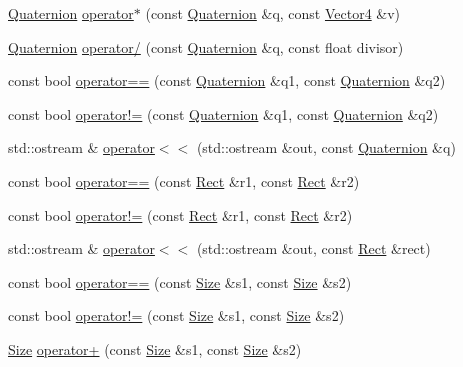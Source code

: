 \begin{DoxyCompactItemize}
\item 
\hyperlink{classprism_1_1_quaternion}{Quaternion} \hyperlink{namespaceprism_a2c4c5e120d8c4de9891f2261a50f100e}{operator$\ast$} (const \hyperlink{classprism_1_1_quaternion}{Quaternion} \&q, const \hyperlink{classprism_1_1_vector4}{Vector4} \&v)
\item 
\hyperlink{classprism_1_1_quaternion}{Quaternion} \hyperlink{namespaceprism_aec648937a53338bcd9879670877d0425}{operator/} (const \hyperlink{classprism_1_1_quaternion}{Quaternion} \&q, const float divisor)
\item 
const bool \hyperlink{namespaceprism_ac4ae112433b9ab32c801cccc9c3f74f0}{operator==} (const \hyperlink{classprism_1_1_quaternion}{Quaternion} \&q1, const \hyperlink{classprism_1_1_quaternion}{Quaternion} \&q2)
\item 
const bool \hyperlink{namespaceprism_a9e32551f997ae19dc52df146482405c1}{operator!=} (const \hyperlink{classprism_1_1_quaternion}{Quaternion} \&q1, const \hyperlink{classprism_1_1_quaternion}{Quaternion} \&q2)
\item 
std\+::ostream \& \hyperlink{namespaceprism_ad2beaed7a837821f0abc608cf6ac6c0f}{operator$<$$<$} (std\+::ostream \&out, const \hyperlink{classprism_1_1_quaternion}{Quaternion} \&q)
\item 
const bool \hyperlink{namespaceprism_abe409fa2ef458a2d477ed7845cf4b6a6}{operator==} (const \hyperlink{classprism_1_1_rect}{Rect} \&r1, const \hyperlink{classprism_1_1_rect}{Rect} \&r2)
\item 
const bool \hyperlink{namespaceprism_ad9f46c5ebd3cec844925173aaacbed9f}{operator!=} (const \hyperlink{classprism_1_1_rect}{Rect} \&r1, const \hyperlink{classprism_1_1_rect}{Rect} \&r2)
\item 
std\+::ostream \& \hyperlink{namespaceprism_a52fd2a97b66b06ba6e451e1890136ff4}{operator$<$$<$} (std\+::ostream \&out, const \hyperlink{classprism_1_1_rect}{Rect} \&rect)
\item 
const bool \hyperlink{namespaceprism_a2a7baeb09cd2ee29251667ad18a2bd00}{operator==} (const \hyperlink{classprism_1_1_size}{Size} \&s1, const \hyperlink{classprism_1_1_size}{Size} \&s2)
\item 
const bool \hyperlink{namespaceprism_a63ab3c18ecc73e21e7281dbe180e07e8}{operator!=} (const \hyperlink{classprism_1_1_size}{Size} \&s1, const \hyperlink{classprism_1_1_size}{Size} \&s2)
\item 
\hyperlink{classprism_1_1_size}{Size} \hyperlink{namespaceprism_a7141aeb35db81548155e44d60c05530e}{operator+} (const \hyperlink{classprism_1_1_size}{Size} \&s1, const \hyperlink{classprism_1_1_size}{Size} \&s2)

\end{DoxyCompactItemize}
